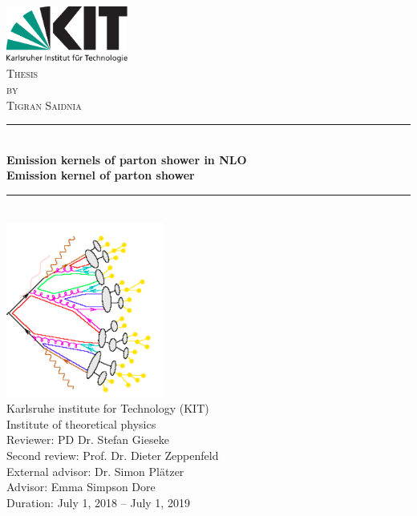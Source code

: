 \begin{titlepage}

\begin{center}


\includegraphics[width=0.3\textwidth]{images/Intro/kitlogo_de_rgb}\\[1cm]    

\textsc{\LARGE Thesis}\\[0.5cm]
\textsc{\Large by}\\[0.5cm]
\textsc{\Large Tigran Saidnia}\\[1.0cm]


\newcommand{\HRule}{\rule{\linewidth}{0.5mm}}
\HRule \\[0.8mm]
{\textbf{\Large \bfseries Emission kernels of parton shower in NLO}}\\[0.8mm]

{\textbf{\bfseries Emission kernel of parton shower}}\\[0.8mm]

\HRule \\[1cm]
\includegraphics[scale=0.7]{images/Intro/footPicture.PNG}\\[0.8cm]   

\Large Karlsruhe institute for Technology (KIT)\\[1.5mm]
\Large Institute of theoretical physics\\[1.0cm]

{\Large Reviewer: PD Dr. Stefan Gieseke \\
\Large Second review: Prof. Dr. Dieter Zeppenfeld\\
\Large External advisor: Dr. Simon Plätzer\\
\Large Advisor: Emma Simpson Dore}\\[0.8cm]   

Duration: July 1, 2018  –  July 1, 2019

\vfill


\end{center}

\end{titlepage}